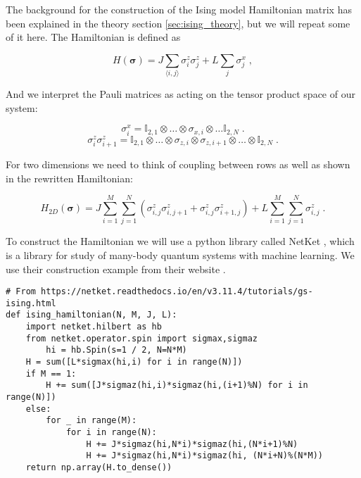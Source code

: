 The background for the construction of the Ising model Hamiltonian matrix has been explained in the theory section \ref{sec:ising_theory}, but we will repeat some of it here. The Hamiltonian is defined as

\begin{equation}
  H(\boldsymbol{\sigma}) =J\sum_{\langle i,j\rangle} \sigma^z_i\sigma^z_j + L \sum_j \sigma^x_j \; ,
\end{equation}

And we interpret the Pauli matrices as acting on the tensor product space of our system:

\begin{equation}
  \sigma_i^x = \mathbb{I}_{2, 1} \otimes \dots \otimes \sigma_{x, i} \otimes \dots \mathbb{I}_{2, N} \; .
\end{equation}
\begin{equation}
  \sigma_i^z \sigma_{i+1}^z = \mathbb{I}_{2, 1} \otimes \dots \otimes \sigma_{z, i} \otimes \sigma_{z, i+1} \otimes \dots \otimes \mathbb{I}_{2, N} \; .
\end{equation}

For two dimensions we need to think of coupling between rows as well as shown in the rewritten Hamiltonian:

\begin{equation}
  H_{2D}(\boldsymbol{\sigma}) =J\sum_{i = 1}^M\sum_{j = 1}^N \left (\sigma^z_{i, j}\sigma^z_{i, j + 1} + \sigma_{i, j}^z\sigma^z_{i+1, j} \right )+ L \sum_{i = 1}^M\sum_{j = 1}^N\sigma^z_{i, j} \; .
\end{equation}

To construct the Hamiltonian we will use a python library called NetKet \cite{netket3:2022}\cite{netket2:2019}\cite{mpi4jax:2021}, which is a library for study of many-body quantum systems with machine learning. We use their construction example from their website \cite{netketising}.

\begin{verbatim}
# From https://netket.readthedocs.io/en/v3.11.4/tutorials/gs-ising.html
def ising_hamiltonian(N, M, J, L):
    import netket.hilbert as hb
    from netket.operator.spin import sigmax,sigmaz
        hi = hb.Spin(s=1 / 2, N=N*M)
    H = sum([L*sigmax(hi,i) for i in range(N)])
    if M == 1:
        H += sum([J*sigmaz(hi,i)*sigmaz(hi,(i+1)%N) for i in range(N)])
    else:
        for _ in range(M):
            for i in range(N):
                H += J*sigmaz(hi,N*i)*sigmaz(hi,(N*i+1)%N)
                H += J*sigmaz(hi,N*i)*sigmaz(hi, (N*i+N)%(N*M)) 
    return np.array(H.to_dense())
\end{verbatim}

